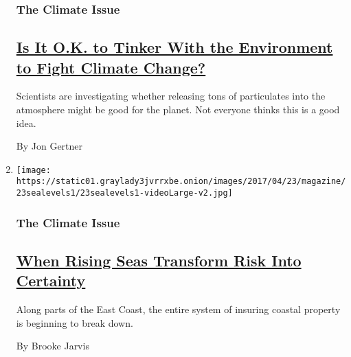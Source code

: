 \begin{enumerate}
  \hypertarget{the-climate-issue-2}{%
  \subsubsection{The Climate Issue}\label{the-climate-issue-2}}

  \hypertarget{is-it-ok-to-tinker-with-the-environment-to-fight-climate-change}{%
  \subsection{\texorpdfstring{\href{/2017/04/18/magazine/is-it-ok-to-engineer-the-environment-to-fight-climate-change.html}{Is
  It O.K. to Tinker With the Environment to Fight Climate
  Change?}}{Is It O.K. to Tinker With the Environment to Fight Climate Change?}}\label{is-it-ok-to-tinker-with-the-environment-to-fight-climate-change}}

  Scientists are investigating whether releasing tons of particulates
  into the atmosphere might be good for the planet. Not everyone thinks
  this is a good idea.

  By Jon Gertner
\item
  \texttt{[image: https://static01.graylady3jvrrxbe.onion/images/2017/04/23/magazine/23sealevels1/23sealevels1-videoLarge-v2.jpg]}

  \hypertarget{the-climate-issue-3}{%
  \subsubsection{The Climate Issue}\label{the-climate-issue-3}}

  \hypertarget{when-rising-seas-transform-risk-into-certainty}{%
  \subsection{\texorpdfstring{\href{/2017/04/18/magazine/when-rising-seas-transform-risk-into-certainty.html}{When
  Rising Seas Transform Risk Into
  Certainty}}{When Rising Seas Transform Risk Into Certainty}}\label{when-rising-seas-transform-risk-into-certainty}}

  Along parts of the East Coast, the entire system of insuring coastal
  property is beginning to break down.

  By Brooke Jarvis
\end{enumerate}

